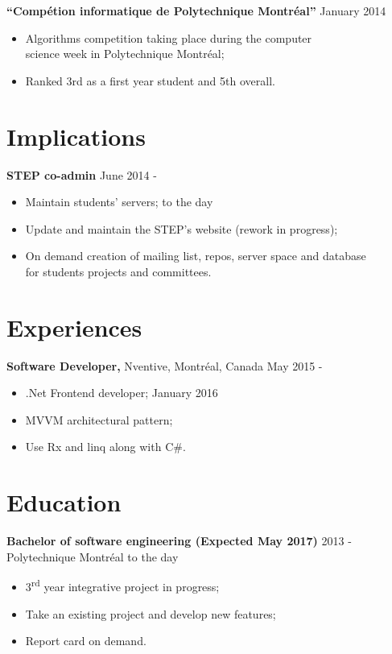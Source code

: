 \documentclass[margin]{res}
\begin{document}
\begin{resume}
  {\bf ``Comp\'{e}tion informatique de Polytechnique Montr\'{e}al''} \hfill January 2014
  \begin{itemize} \itemsep -2pt
  \item Algorithms competition taking place during the computer \\science week in Polytechnique  Montr\'{e}al;
  \item Ranked 3rd as a first year student and 5th overall.
  \end{itemize}


  \section{Implications}
  
  {\bf STEP co-admin} \hfill June 2014 -
  \begin{itemize} \itemsep -2pt
  \item Maintain students' servers; \hfill to the day
  \item Update and maintain the STEP's website (rework in progress);
  \item On demand creation of mailing list, repos, server space and database\\ for students projects and committees.
  \end{itemize}
  
  
  \section{Experiences}

  {\bf Software Developer,} Nventive, Montr\'eal, Canada \hfill May 2015 -
  \begin{itemize} \itemsep -2pt  %
  \item .Net Frontend developer; \hfill January 2016
  \item MVVM  architectural pattern;
  \item Use Rx and linq along with C\#.
  \end{itemize}
  
    

  \section{Education}
  
  {\bf Bachelor of software engineering (Expected May 2017)} \hfill 2013 -\\ 
  Polytechnique Montr\'{e}al \hfill to the day
  \begin{itemize} \itemsep -2pt
  \item 3\textsuperscript{rd} year integrative project in progress;
  \item Take an existing project and develop new features;
  \item Report card on demand.
  \end{itemize}
  

\end{resume}
\end{document}
